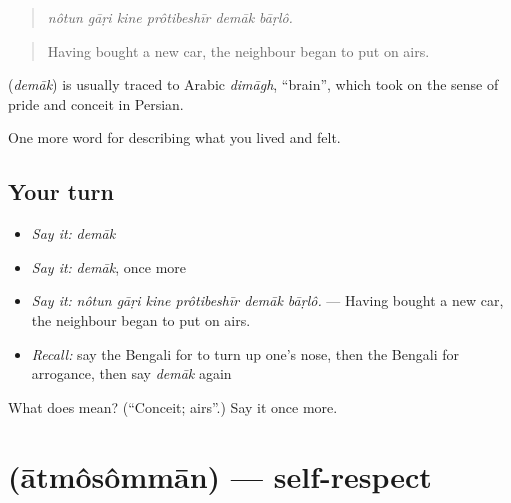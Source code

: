 \begin{quote}
     
\end{quote}

\begin{quote}
\emph{nôtun gāṛi kine prôtibeshīr demāk bāṛlô.}
\end{quote}

\begin{quote}
Having bought a new car, the neighbour began to put on airs.
\end{quote}

\begin{cousinweb}
\textbf{} (\emph{demāk}) is usually traced to Arabic \emph{dimāgh}, \textquotedblleft{}brain\textquotedblright{}, which took on the sense of pride and conceit in Persian.
\end{cousinweb}

\begin{grammarlens}[title={What you've built}]
One more word for describing what you lived and felt.
\end{grammarlens}

\subsection*{Your turn}
\begin{itemize}
\raggedright
  \item \emph{Say it:} \emph{demāk}
  \item \emph{Say it:} \emph{demāk}, once more
  \item \emph{Say it:} \emph{nôtun gāṛi kine prôtibeshīr demāk bāṛlô.} — Having bought a new car, the neighbour began to put on airs.
  \item \emph{Recall:} say the Bengali for to turn up one's nose, then the Bengali for arrogance, then say \emph{demāk} again
\end{itemize}

\begin{tcolorbox}[breakable,colback=teal!4,colframe=teal!35!black,title={Before you move on}]
What does  mean? (\textquotedblleft{}Conceit; airs\textquotedblright{}.) Say it once more.
\end{tcolorbox}
\section[\texorpdfstring{\bn{আত্মসম্মান} (ātmôsômmān)}{আত্মসম্মান (ātmôsômmān)}]{ (ātmôsômmān) — self-respect}


